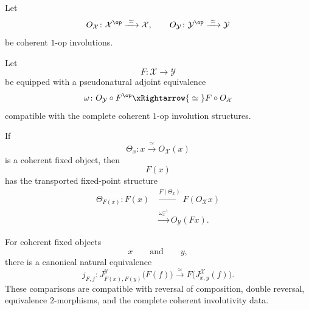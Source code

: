 \begin{proposition}
\label{prop:fixed-endpoint-transport-one-op-functoriality}
Let
\[
    O_{\mathcal X}
    \colon
    \mathcal X^{\op}
    \xrightarrow{\;\simeq\;}
    \mathcal X,
    \qquad
    O_{\mathcal Y}
    \colon
    \mathcal Y^{\op}
    \xrightarrow{\;\simeq\;}
    \mathcal Y
\]
be coherent $1$-op involutions.

Let
\[
    F
    \colon
    \mathcal X
    \longrightarrow
    \mathcal Y
\]
be equipped with a pseudonatural adjoint equivalence
\[
    \omega
    \colon
    O_{\mathcal Y}
    \circ
    F^{\op}
    \xRightarrow{\;\simeq\;}
    F
    \circ
    O_{\mathcal X}
\]
compatible with the complete coherent $1$-op involution structures.

If
\[
    \Theta_x
    \colon
    x
    \xrightarrow{\;\simeq\;}
    O_{\mathcal X}(x)
\]
is a coherent fixed object, then
\[
    F(x)
\]
has the transported fixed-point structure
\[
\begin{aligned}
    \Theta_{F(x)}
    \colon
    F(x)
    &\xrightarrow{F(\Theta_x)}
    F(O_{\mathcal X}x)
    \\
    &\xrightarrow{\omega_x^{-1}}
    O_{\mathcal Y}(Fx).
\end{aligned}
\]

For coherent fixed objects
\[
    x
    \qquad\text{and}\qquad
    y,
\]
there is a canonical natural equivalence
\[
    j_{F,f}
    \colon
    J^{\mathcal Y}_{F(x),F(y)}
    \bigl(
        F(f)
    \bigr)
    \xrightarrow{\;\simeq\;}
    F
    \bigl(
        J^{\mathcal X}_{x,y}(f)
    \bigr).
\]
These comparisons are compatible with reversal of composition,
double reversal, equivalence $2$-morphisms, and the complete coherent
involutivity data.
\end{proposition}

